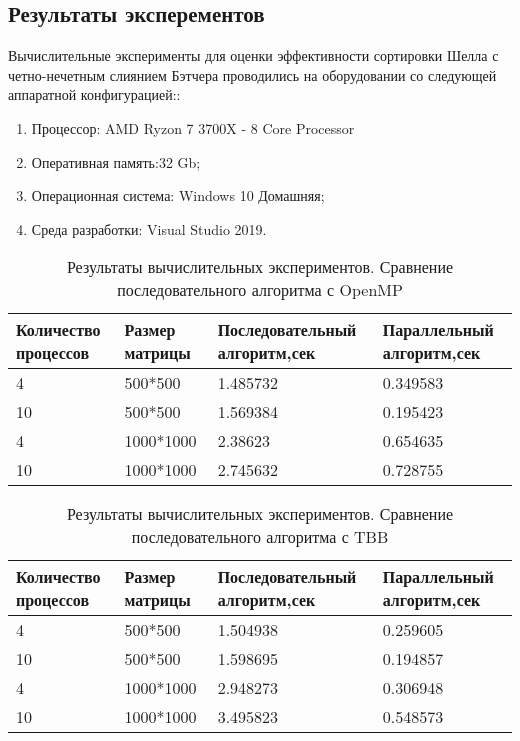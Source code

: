 \documentclass{report}
\begin{document}
\begin{center}
\section*{Результаты эксперементов}
\end{center}
\par Вычислительные эксперименты для оценки эффективности сортировки Шелла с четно-нечетным слиянием Бэтчера проводились на оборудовании со следующей аппаратной конфигурацией::
\begin{enumerate}
\item Процессор: AMD Ryzon 7 3700X - 8 Core Processor
\item Оперативная память:32 Gb;
\item Операционная система: Windows 10 Домашняя;
\item Среда разработки: Visual Studio 2019.
\end{enumerate}
\begin{table}[!h]
\caption{Результаты вычислительных экспериментов. Сравнение последовательного алгоритма с OpenMP}
\centering
\begin{tabular}{|p{4cm}|p{4cm}|p{4cm}|p{4cm}|}
\hline
Количество процессов & Размер матрицы & Последовательный алгоритм,сек & Параллельный алгоритм,сек \\\hline
4  & 500*500 & 1.485732 & 0.349583   \\\hline
10  & 500*500 & 1.569384 & 0.195423  \\\hline
4 & 1000*1000 & 2.38623 & 0.654635  \\\hline
10  & 1000*1000 & 2.745632 & 0.728755  \\
\hline
\end{tabular}
\end{table}

\begin{table}[!h]
\caption{Результаты вычислительных экспериментов. Сравнение последовательного алгоритма с TBB}
\centering
\begin{tabular}{|p{4cm}|p{4cm}|p{4cm}|p{4cm}|}
\hline
Количество процессов & Размер матрицы & Последовательный алгоритм,сек & Параллельный алгоритм,сек \\\hline
4  & 500*500 & 1.504938 & 0.259605   \\\hline
10  & 500*500 & 1.598695 & 0.194857  \\\hline
4 & 1000*1000 & 2.948273 & 0.306948 \\\hline
10  & 1000*1000 & 3.495823 & 0.548573  \\
\hline
\end{tabular}
\end{table}
\newpage
\end{document}
